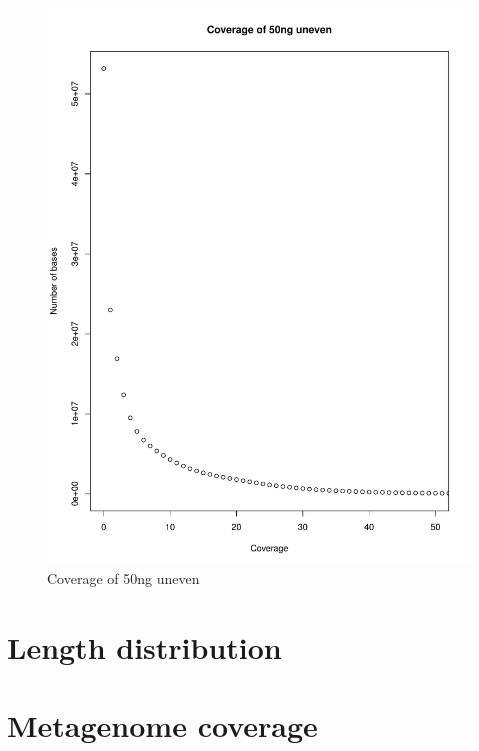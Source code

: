 \documentclass[a4paper,12pt]{report}
\begin{document}
\begin{figure}[ht!]
  \centering
    \includegraphics[width=\textwidth]{figures/coverageperbase-50ng_unbalanced.pdf}
  \caption{Coverage of 50ng uneven}
  \label{fig:coverage50nguneven}
\end{figure}


\section{Length distribution}

\section{Metagenome coverage}
\end{document}

